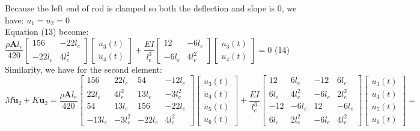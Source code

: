 \documentclass[14pt,a4paper]{article}
\begin{document}
\begin{enumerate}
	Because the left end of rod is clamped so both the deflection and slope is 0, we have: $u_1 = u_2 =0$\\
	Equation (13) become:\\
	\hspace*{2cm} $\dfrac{\rho \textbf{A}l_e}{420} \begin{bmatrix} 156 & -22l_e \\ -22l_e & 4l_e^2 \end{bmatrix} \begin{bmatrix} \ddot{u}_3(t) \\ \ddot{u}_4(t) \end{bmatrix} + \dfrac{EI}{l_e^3} \begin{bmatrix} 12 & -6l_e \\ -6l_e & 4l_e^2 \end{bmatrix} \begin{bmatrix} u_3(t) \\ u_4(t) \end{bmatrix} = 0$ \hspace{2cm} (14) \\
	
	Similarity, we have for the second element:\\
	$M\ddot{\textbf{u}}_2 + K\textbf{u}_2 = \dfrac{\rho \textbf{A}l_e}{420} \begin{bmatrix} 156 & 22l_e & 54 & -12l_e \\ 22l_e & 4l_e^2 & 13l_e & -3l_e^2 \\ 54 & 13l_e & 156 & -22l_e \\ -13l_e & -3l_e^2 & -22l_e & 4l_e^2 \end{bmatrix} \begin{bmatrix} \ddot{u}_3(t) \\ \ddot{u}_4(t) \\ \ddot{u}_5(t) \\ \ddot{u}_6(t) \end{bmatrix} + \dfrac{EI}{l_e^3} \begin{bmatrix} 12 & 6l_e & -12 & 6l_e \\ 6l_e & 4l_e^2 & -6l_e & 2l_e^2 \\ -12 & -6l_e & 12 & -6l_e \\ 6l_e & 2l_e^2 & -6l_e & 4l_e^2 \end{bmatrix} \begin{bmatrix} u_3(t) \\ u_4(t) \\ u_5(t) \\ u_6(t) \end{bmatrix} =$\\
	

\end{enumerate}
\end{document}
